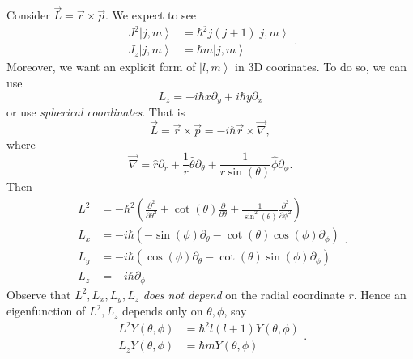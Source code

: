 \documentclass[phys334]{subfiles}
\begin{document}
    \np Consider $\vec{L}=\vec{r}\times\vec{p}$. We expect to see
    \begin{equation*}
        \begin{aligned}
            J^{2}\left| j,m \right\rangle & = \hbar^{2}j\left( j+1 \right)\left| j,m \right\rangle \\
            J_z\left| j,m \right\rangle & = \hbar m\left| j,m \right\rangle
        \end{aligned} .
    \end{equation*}
    Moreover, we want an explicit form of $\left| l,m \right\rangle$ in 3D coorinates. To do so, we can use
    \begin{equation*}
        L_z = -i\hbar x\partial_y + i\hbar y\partial_x
    \end{equation*}
    or use \textit{spherical coordinates}. That is
    \begin{equation*}
        \vec{L} = \vec{r}\times\vec{p} = -i\hbar\vec{r}\times\vec{\nabla},
    \end{equation*}
    where
    \begin{equation*}
        \vec{\nabla} = \hat{r}\partial_r + \frac{1}{r}\hat{\theta} \partial_{\theta} + \frac{1}{r\sin\left( \theta \right)} \hat{\phi}\partial_{\phi} .
    \end{equation*}
    Then
    \begin{equation*}
        \begin{aligned}
            L^{2} & = -\hbar^{2} \left( \frac{\partial^{2}}{\partial\theta^{2}} + \cot\left( \theta \right) \frac{\partial}{\partial\theta} + \frac{1}{\sin^{2}\left( \theta \right)} \frac{\partial^{2}}{\partial\phi^{2}} \right) \\
            L_x & = -i\hbar\left( -\sin\left( \phi \right)\partial_{\theta} - \cot\left( \theta \right)\cos\left( \phi \right)\partial_{\phi} \right) \\
            L_y & = -i\hbar\left( \cos\left( \phi \right)\partial_{\theta} - \cot\left( \theta \right)\sin\left( \phi \right)\partial_{\phi} \right) \\
            L_z & = -i\hbar\partial_{\phi}
        \end{aligned}. 
    \end{equation*}
    Observe that $L^{2},L_x,L_y,L_z$ \textit{does not depend} on the radial coordinate $r$. Hence an eigenfunction of $L^{2},L_z$ depends only on $\theta,\phi$, say
    \begin{equation*}
        \begin{aligned}
            L^{2}Y\left( \theta,\phi \right) & = \hbar^{2}l\left( l+1 \right)Y\left( \theta,\phi \right) \\
            L_zY\left( \theta,\phi \right) & = \hbar mY\left( \theta,\phi \right)
        \end{aligned} .
    \end{equation*}
\end{document}
